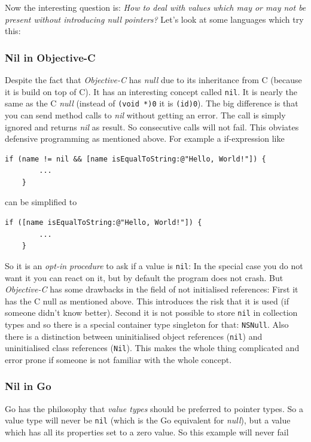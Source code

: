 \documentclass[11pt, a4paper]{report}
\begin{document}
Now the interesting question is: \textit{How to deal with values which may or may not be present without introducing null pointers?} Let's look at some languages which try this:

\subsubsection{Nil in Objective-C}
Despite the fact that \textit{Objective-C} has \textit{null} due to its inheritance from C (because it is build on top of C). It has an interesting concept called \texttt{nil}. It is nearly the same as the C \textit{null} (instead of \texttt{(void *)0} it is \texttt{(id)0}). The big difference is that you can send method calls to \textit{nil} without getting an error. The call is simply ignored and returns \textit{nil} as result. So consecutive calls will not fail. This obviates defensive programming as mentioned above. For example a if-expression like

\begin{lstlisting}[language={[Objective]C}]
    if (name != nil && [name isEqualToString:@"Hello, World!"]) {
        ...
    }
\end{lstlisting}

can be simplified to

\begin{lstlisting}[language={[Objective]C}]
    if ([name isEqualToString:@"Hello, World!"]) { 
        ...
    }
\end{lstlisting}

So it is an \textit{opt-in procedure} to ask if a value is \texttt{nil}: In the special case you do not want it you can react on it, but by default the program does not crash. But \textit{Objective-C} has some drawbacks in the field of not initialised references: First it has the C null as mentioned above. This introduces the risk that it is used (if someone didn't know better). Second it is not possible to store \texttt{nil} in collection types and so there is a special container type singleton for that: \texttt{NSNull}. Also there is a distinction between uninitialised object references (\texttt{nil}) and uninitialised class references (\texttt{Nil}). This makes the whole thing complicated and error prone if someone is not familiar with the whole concept.

\subsubsection{Nil in Go}
Go has the philosophy that \textit{value types} should be preferred to pointer types. So a value type will never be \texttt{nil} (which is the Go equivalent for \textit{null}), but a value which has all its properties set to a zero value\cite{golang-spec}. So this example will never fail
\end{document}
